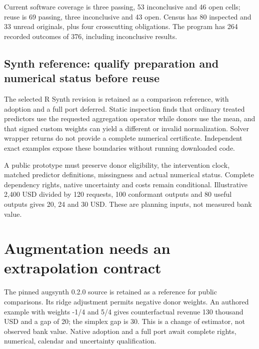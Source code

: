 Current software coverage is three passing, 53 inconclusive and 46 open
cells; reuse is 69 passing, three inconclusive and 43 open. Census has
80 inspected and 33 unread originals, plus four crosscutting
obligations. The program has 264 recorded outcomes of 376, including
inconclusive results.
\citep{sp24synth_reader,sp24synth_progress,sp24augsynth_reader,sp24augsynth_progress}

\hypertarget{synth-reference-qualify-preparation-and-numerical-status-before-reuse}{%
\subsection{Synth reference: qualify preparation and numerical status
before
reuse}\label{synth-reference-qualify-preparation-and-numerical-status-before-reuse}}

The selected R Synth revision is retained as a comparison reference,
with adoption and a full port deferred. Static inspection finds that
ordinary treated predictors use the requested aggregation operator while
donors use the mean, and that signed custom weights can yield a
different or invalid normalization. Solver wrapper returns do not
provide a complete numerical certificate. Independent exact examples
expose these boundaries without running downloaded code.
\citep{exec24_synth_source,exec24_synth_choice}

A public prototype must preserve donor eligibility, the intervention
clock, matched predictor definitions, missingness and actual numerical
status. Complete dependency rights, native uncertainty and costs remain
conditional. Illustrative 2,400 USD divided by 120 requests, 100
conformant outputs and 80 useful outputs gives 20, 24 and 30 USD. These
are planning inputs, not measured bank value.
\citep{exec24_synth_choice}

\hypertarget{augmentation-needs-an-extrapolation-contract}{%
\section{Augmentation needs an extrapolation
contract}\label{augmentation-needs-an-extrapolation-contract}}

The pinned augsynth 0.2.0 source is retained as a reference for public
comparisons. Its ridge adjustment permits negative donor weights. An
authored example with weights -1/4 and 5/4 gives counterfactual revenue
130 thousand USD and a gap of 20; the simplex gap is 30. This is a
change of estimator, not observed bank value. Native adoption and a full
port await complete rights, numerical, calendar and uncertainty
qualification. \citep{exec24_augsynth_source,exec24_augsynth_choice}

